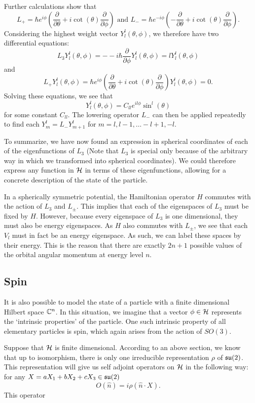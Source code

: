 \documentclass[a4paper]{article}
\begin{document}
Further calculations show that 
$$L_{+} = \hbar e^{i\phi} \left(\frac{\partial}{\partial \theta} + i\cot(\theta)\frac{\partial}{\partial \phi}\right) \text{  and  } L_{-} = \hbar e^{-i\phi} \left(-\frac{\partial}{\partial \theta} + i\cot(\theta)\frac{\partial}{\partial \phi}\right).$$
Considering the highest weight vector $Y^l_{l}(\theta, \phi)$, we therefore have two differential equations: $$L_3 Y^l_{l}(\theta, \phi) = - -i\hbar \frac{\partial}{\partial \phi} Y^l_{l}(\theta, \phi) = l Y^l_{l}(\theta, \phi)$$ 
and 
$$L_{+} Y^l_{l}(\theta, \phi) = \hbar e^{i\phi} \left(\frac{\partial}{\partial \theta} + i\cot(\theta)\frac{\partial}{\partial \phi}\right)Y^l_{l}(\theta, \phi) = 0.$$
Solving these equations, we see that 
$$Y^l_{l}(\theta, \phi) = C_{ll} e^{il\phi}\sin^{l}(\theta)$$
for some constant $C_{ll}$. The lowering operator $L_{-}$ can then be applied repeatedly to find each $Y^l_{m} = L_{-}Y^l_{m+1}$ for $m = l, l -1, \hdots -l + 1, -l$.

To summarize, we have now found an expression in spherical coordinates of each of the eigenfunctions of $L_3$ (Note that $L_3$ is special only because of the arbitrary way in which we transformed into spherical coordinates). We could therefore express any function in $\mathcal{H}$ in terms of these eigenfunctions, allowing for a concrete description of the state of the particle.

In a spherically symmetric potential, the Hamiltonian operator $H$ commutes with the action of $L_3$ and $L_{\pm}$. This implies that each of the eigenspaces of $L_3$ must be fixed by $H$. However, because every eigenspace of $L_3$ is one dimensional, they must also be energy eigenspaces. As $H$ also commutes with $L_{\pm}$, we see that each $V_l$ must in fact be an energy eigenspace. As such, we can label these spaces by their energy. This is the reason that there are exactly $2n+ 1$ possible values of the orbital angular momentum at energy level $n$.

\subsection{Spin}
It is also possible to model the state of a particle with a finite dimensional Hilbert space $\mathbb{C}^n$. In this situation, we imagine that a vector $\phi \in \mathcal{H}$ represents the `intrinsic properties' of the particle. One such intrinsic property of all elementary particles is spin, which again arises from the action of $SO(3)$. 

Suppose that $\mathcal{H}$ is finite dimensional. According to an above section, we know that up to isomorphism, there is only one irreducible representation $\rho$ of $\mathfrak{su}(2)$. This representation will give us self adjoint operators on $\mathcal{H}$ in the following way: for any $X = a X_1 + b X_2 + c X_3 \in \mathfrak{su}(2)$
$$O(\hat{n}) = i\rho(\hat{n} \cdot X).$$
This operator 
\end{document}

